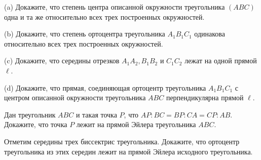 (a) Докажите, что степень центра описанной окружности треугольника $(A B C)$ одна и та же относительно всех трех построенных окружностей.

(b) Докажите, что степень ортоцентра треугольника $A_1 B_1 C_1$ одинакова относительно всех трех построенных окружностей.

(c) Докажите, что середины отрезков $A_1 A_2, B_1 B_2$ и $C_1 C_2$ лежат на одной прямой $\ell$.

(d) Докажите, что прямая, соединяющая ортоцентр треугольника $A_1 B_1 C_1$ с центром описанной окружности треугольника $A B C$ перпендикулярна прямой $\ell$.

Дан треугольник $A B C$ и такая точка $P$, что $A P: B C=B P: C A=C P: A B$. Докажите, что точка $P$ лежит на прямой Эйлера треугольника $A B C$.

Отметим середины трех биссектрис треугольника. Докажите, что ортоцентр треугольника из этих середин лежит на прямой Эйлера исходного треугольника.